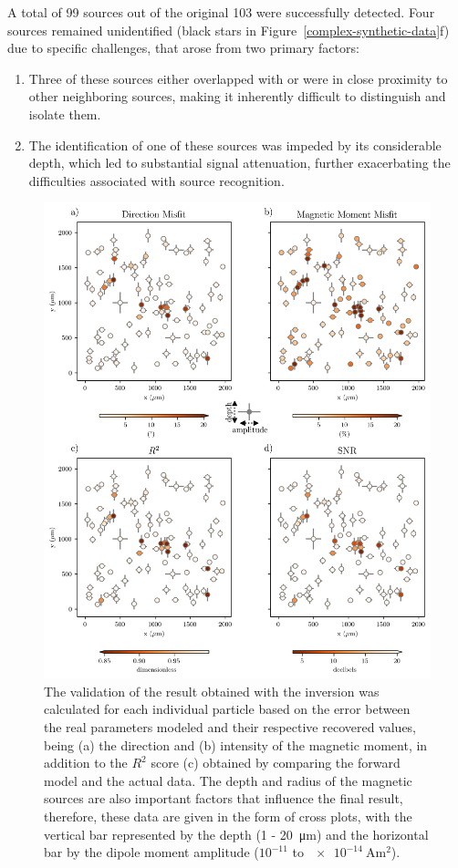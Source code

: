 A total of 99 sources out of the original 103 were successfully detected. Four sources remained unidentified (black stars in Figure~\ref{complex-synthetic-data}f) due to specific challenges, that arose from two primary factors:

\begin{enumerate}
    \item Three of these sources either overlapped with or were in close proximity to other neighboring sources, making it inherently difficult to distinguish and isolate them.
    \item The identification of one of these sources was impeded by its considerable depth, which led to substantial signal attenuation, further exacerbating the difficulties associated with source recognition.
\end{enumerate}

\begin{figure}[tb!]
\centering
\includegraphics[width=0.75\linewidth]{figures/complex-synthetic-comparison.png}
\caption{
The validation of the result obtained with the inversion was calculated for each individual particle based on the error between the real parameters modeled and their respective recovered values, being (a) the direction and (b) intensity of the magnetic moment, in addition to the $R^2$ score (c) obtained by comparing the forward model and the actual data. The depth and radius of the magnetic sources are also important factors that influence the final result, therefore, these data are given in the form of cross plots, with the vertical bar represented by the depth (1 - \qty{20}{\um}) and the horizontal bar by the dipole moment amplitude ($10^{-11}$ to $\qty{e-14}{\ampere\m\squared}$).
}
\label{complex-synthetic-comparison}
\end{figure}

